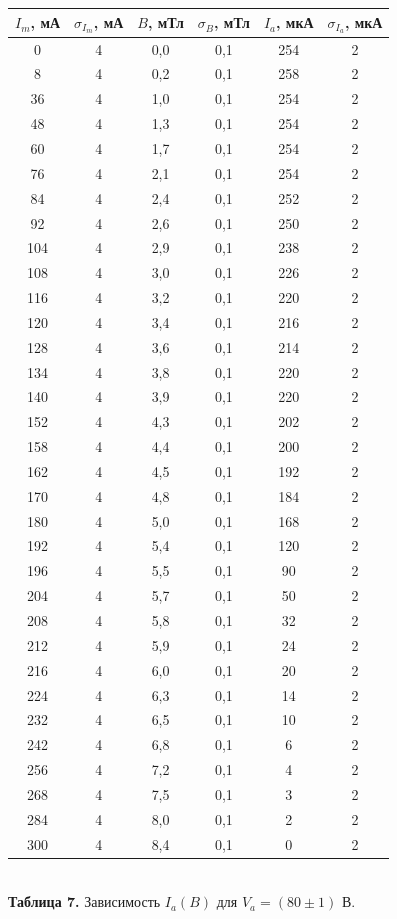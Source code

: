 \documentclass[a4paper, 12pt]{article}%
\begin{document}
\begin{center}
\begin{tabular}{|c|c|c|c|c|c|}
\hline
$I_m$, мА & $\sigma_{I_m}$, мА & $B$, мТл & $\sigma_B$, мТл & $I_a$, мкА & $\sigma_{I_a}$, мкА \\ \hline
0 & 4 & 0,0 & 0,1 & 254 & 2 \\ \hline
8 & 4 & 0,2 & 0,1 & 258 & 2 \\ \hline
36 & 4 & 1,0 & 0,1 & 254 & 2 \\ \hline
48 & 4 & 1,3 & 0,1 & 254 & 2 \\ \hline
60 & 4 & 1,7 & 0,1 & 254 & 2 \\ \hline
76 & 4 & 2,1 & 0,1 & 254 & 2 \\ \hline
84 & 4 & 2,4 & 0,1 & 252 & 2 \\ \hline
92 & 4 & 2,6 & 0,1 & 250 & 2 \\ \hline
104 & 4 & 2,9 & 0,1 & 238 & 2 \\ \hline
108 & 4 & 3,0 & 0,1 & 226 & 2 \\ \hline
116 & 4 & 3,2 & 0,1 & 220 & 2 \\ \hline
120 & 4 & 3,4 & 0,1 & 216 & 2 \\ \hline
128 & 4 & 3,6 & 0,1 & 214 & 2 \\ \hline
134 & 4 & 3,8 & 0,1 & 220 & 2 \\ \hline
140 & 4 & 3,9 & 0,1 & 220 & 2 \\ \hline
152 & 4 & 4,3 & 0,1 & 202 & 2 \\ \hline
158 & 4 & 4,4 & 0,1 & 200 & 2 \\ \hline
162 & 4 & 4,5 & 0,1 & 192 & 2 \\ \hline
170 & 4 & 4,8 & 0,1 & 184 & 2 \\ \hline
180 & 4 & 5,0 & 0,1 & 168 & 2 \\ \hline
192 & 4 & 5,4 & 0,1 & 120 & 2 \\ \hline
196 & 4 & 5,5 & 0,1 & 90 & 2 \\ \hline
204 & 4 & 5,7 & 0,1 & 50 & 2 \\ \hline
208 & 4 & 5,8 & 0,1 & 32 & 2 \\ \hline
212 & 4 & 5,9 & 0,1 & 24 & 2 \\ \hline
216 & 4 & 6,0 & 0,1 & 20 & 2 \\ \hline
224 & 4 & 6,3 & 0,1 & 14 & 2 \\ \hline
232 & 4 & 6,5 & 0,1 & 10 & 2 \\ \hline
242 & 4 & 6,8 & 0,1 & 6 & 2 \\ \hline
256 & 4 & 7,2 & 0,1 & 4 & 2 \\ \hline
268 & 4 & 7,5 & 0,1 & 3 & 2 \\ \hline
284 & 4 & 8,0 & 0,1 & 2 & 2 \\ \hline
300 & 4 & 8,4 & 0,1 & 0 & 2 \\ \hline
\end{tabular}\\
\textbf{Таблица 7.} Зависимость $I_a(B)$ для $V_a = (80 \pm 1)$ В.
\end{center}
\end{document}
